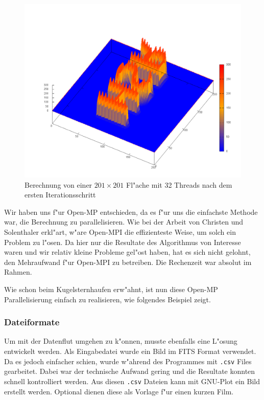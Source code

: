 \begin{refsection}
\begin{figure}
\centering
\includegraphics[width=\hsize]{green/images/step001}
\caption{Berechnung von einer $201 \times 201$ Fl"ache mit 32 Threads
nach dem ersten Iterationsschritt}
\label{fig:201_1}
\end{figure}
		
		
Wir haben uns f"ur Open-MP entschieden, da es f"ur uns die einfachste
Methode war, die Berechnung zu parallelisieren. Wie bei der Arbeit
von Christen und Solenthaler erkl"art, w"are Open-MPI die effizienteste
Weise, um solch ein Problem zu l"osen. Da hier nur die Resultate
des Algorithmus von Interesse waren und wir relativ kleine Probleme
gel"ost haben, hat es sich nicht gelohnt, den Mehraufwand f"ur
Open-MPI zu betreiben. Die Rechenzeit war absolut im Rahmen.
		
Wie schon beim Kugelsternhaufen erw"ahnt, ist nun diese Open-MP
Parallelisierung einfach zu realisieren, wie folgendes Beispiel
zeigt.
		
\begin{code}
// Parallelisierung einer for-Schleife
	int numthreads = 32;
	#pragma omp parallel for num_threads(numthreads)
		for (i = 0; i < dim; i++)
		{ ...
\end{code}

\subsubsection{Dateiformate}
	
Um mit der Datenflut umgehen zu k"onnen, musste ebenfalls eine
L"osung entwickelt werden. Als Eingabedatei wurde ein Bild im FITS
Format verwendet. Da es jedoch einfacher schien, wurde w"ahrend des
Programmes mit \texttt{.csv} Files gearbeitet. Dabei war der
technische Aufwand gering und die Resultate konnten schnell
kontrolliert werden. Aus diesen \texttt{.csv} Dateien kann mit GNU-Plot ein
Bild erstellt werden. Optional dienen diese als Vorlage f"ur einen
kurzen Film.


\end{refsection}
